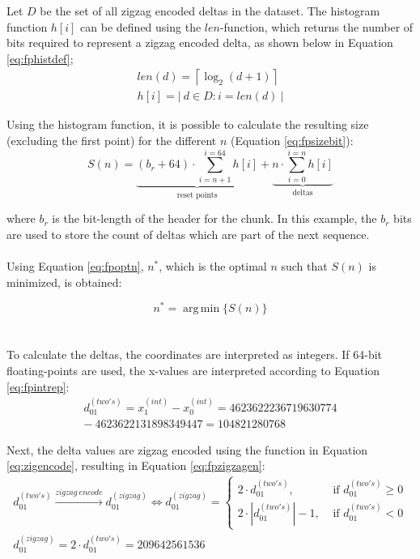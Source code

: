 Let $D$ be the set of all zigzag encoded deltas in the dataset. The histogram function $h[i]$ can be defined using the $len$-function, which returns the number of bits required to represent a zigzag encoded delta, as shown below in Equation \ref{eq:fphistdef};
\begin{equation}\label{eq:fphistdef}
  \begin{gathered}
    len(d) = \left \lceil{\log_2{(d + 1)}}\right \rceil \\
h[i] = |\ { d \in D : i = len(d) }\ |
  \end{gathered}
\end{equation}

Using the histogram function, it is possible to calculate the resulting size (excluding the first point) for the different \(n\) (Equation \ref{eq:fpsizebit}):
\begin{equation}
S(n)=\underbrace{(b_r+64) \cdot \sum_{i=n+1}^{i=64} h[i]}_{\text{reset points}} + \underbrace{n \cdot \sum_{i=0}^{i=n} h[i]}_{\text{deltas}}
\label{eq:fpsizebit}
\end{equation}

where $b_r$ is the bit-length of the header for the chunk. In this example, the $b_r$ bits are used to store the count of deltas which are part of the next sequence.
\\\\
Using Equation \ref{eq:fpoptn}, $n^*$, which is the optimal $n$ such that $S(n)$ is minimized, is obtained:

\begin{equation}
    n^*={\operatorname{arg\,min}}\{S(n)\}
\label{eq:fpoptn}
\end{equation}
\\\\
To calculate the deltas, the coordinates are interpreted as integers. If 64-bit floating-points are used, the x-values are interpreted according to Equation \ref{eq:fpintrep}:
\begin{equation}
\begin{gathered}
    d_{01}^{(two's)} = x_1^{(int)} - x_0^{(int)} = 4623622236719630774\\ -\ 4623622131898349447 = 104821280768
\end{gathered}
\label{eq:fpintrep}
\end{equation}

Next, the delta values are zigzag encoded using the function in Equation \ref{eq:zigencode}, resulting in Equation \ref{eq:fpzigzagen}:
\begin{equation}
    \begin{gathered}
     d_{01}^{(two's)} \xrightarrow{zigzag\ encode} d_{01}^{(zigzag)} \iff d_{01}^{(zigzag)} = \begin{cases}2 \cdot d_{01}^{(two's)}, & \text { if } d_{01}^{(two's)} \geq 0 \\ 2 \cdot |d_{01}^{(two's)}|-1, & \text { if } d_{01}^{(two's)}<0\end{cases} \\
    d_{01}^{(zigzag)} = 2 \cdot d_{01}^{(two's)} = 209642561536
    \end{gathered}
    \label{eq:fpzigzagen}
\end{equation}


